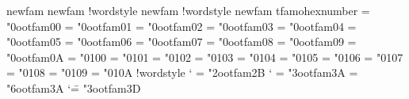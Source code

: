 \!newfam\scfam  %
\!newfam\bsfam  %
\if!wordstyle
    \!newfam\otfam\fi %
%
\if!wordstyle
    \!newfam\otfam %
    \def\!hexnumber#1{%
        \ifcase#1 0\or 1\or 2\or 3\or 4\or 5\or 6\or 7\or 8\or 9
            \or A\or B\or C\or D\or E\or F\fi}
    \edef\!otfam{\!hexnumber\otfam}               %
    \mathchardef\Gamma   = "0\!otfam00       %
    \mathchardef\Delta   = "0\!otfam01
    \mathchardef\Theta   = "0\!otfam02
    \mathchardef\Lambda  = "0\!otfam03
    \mathchardef\Xi      = "0\!otfam04
    \mathchardef\Pi      = "0\!otfam05
    \mathchardef\Sigma   = "0\!otfam06
    \mathchardef\Upsilon = "0\!otfam07
    \mathchardef\Phi     = "0\!otfam08
    \mathchardef\Psi     = "0\!otfam09
    \mathchardef\Omega   = "0\!otfam0A
    \let\mit=\undefined
    \mathchardef\varGamma   = "0100                         %
    \mathchardef\varDelta   = "0101
    \mathchardef\varTheta   = "0102
    \mathchardef\varLambda  = "0103
    \mathchardef\varXi      = "0104
    \mathchardef\varPi      = "0105
    \mathchardef\varSigma   = "0106
    \mathchardef\varUpsilon = "0107
    \mathchardef\varPhi     = "0108
    \mathchardef\varPsi     = "0109
    \mathchardef\varOmega   = "010A\fi
%
\if!wordstyle
    \mathcode`\+ = "2\!otfam2B
    \mathcode`\: = "3\!otfam3A  \mathchardef\colon = "6\!otfam3A
    \mathcode`\= = "3\!otfam3D
